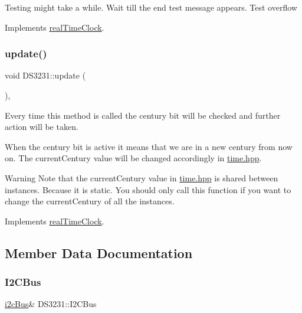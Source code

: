 Testing might take a while. Wait till the end test message appears. Test overflow 

Implements \mbox{\hyperlink{classreal_time_clock_a50cd1b4251b30814575a12269820ab8d}{real\+Time\+Clock}}.

\mbox{\label{class_d_s3231_a143ec57122d892ea0ec671a153352f2c}} 
\subsubsection{\texorpdfstring{update()}{update()}}
{\footnotesize\ttfamily void D\+S3231\+::update (\begin{DoxyParamCaption}{ }\end{DoxyParamCaption})\hspace{0.3cm}{\ttfamily [override]}, {\ttfamily [virtual]}}



Every time this method is called the century bit will be checked and further action will be taken. 

When the century bit is active it means that we are in a new century from now on. The current\+Century value will be changed accordingly in \mbox{\hyperlink{time_8hpp_source}{time.\+hpp}}. \begin{DoxyWarning}{Warning}
Note that the current\+Century value in \mbox{\hyperlink{time_8hpp_source}{time.\+hpp}} is shared between instances. Because it is static. You should only call this function if you want to change the current\+Century of all the instances. 
\end{DoxyWarning}


Implements \mbox{\hyperlink{classreal_time_clock_afb5132ca3cbe80552a88041cead0a2b3}{real\+Time\+Clock}}.



\subsection{Member Data Documentation}
\mbox{\label{class_d_s3231_acffbcfc655349fd392b97dff5f18a56f}} 
\subsubsection{\texorpdfstring{I2\+C\+Bus}{I2CBus}}
{\footnotesize\ttfamily \mbox{\hyperlink{classi2c_bus}{i2c\+Bus}}\& D\+S3231\+::\+I2\+C\+Bus\hspace{0.3cm}{\ttfamily [private]}}



